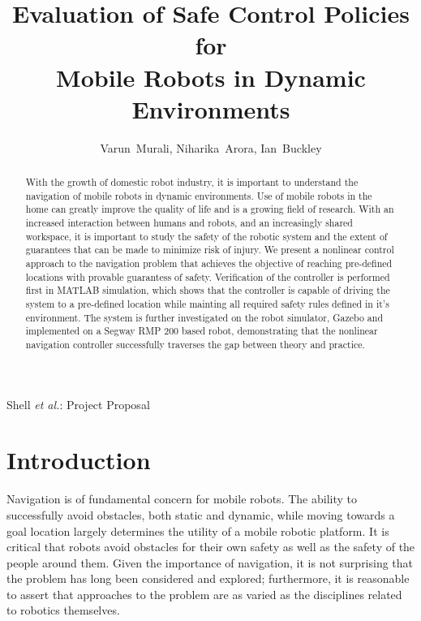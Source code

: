 \documentclass[journal]{IEEEtran}
\begin{document}
\title{Evaluation of Safe Control Policies for \\Mobile Robots in Dynamic Environments }
\author{Varun~Murali, Niharika~Arora, Ian~Buckley}
{Shell \MakeLowercase{\textit{et al.}}: Project Proposal}
\maketitle

\begin{abstract}
With the growth of domestic robot industry, it is important to understand the navigation of mobile robots in dynamic environments. Use of mobile robots in the home can greatly improve the quality of life and is a growing field of research. With an increased interaction between humans and robots, and an increasingly shared workspace, it is important to study the safety of the robotic system and the extent of guarantees that can be made to minimize risk of injury. We present a nonlinear control approach to the navigation problem that achieves the objective of reaching pre-defined locations with provable guarantess of safety. Verification of the controller is performed first in MATLAB simulation, which shows that the controller is capable of driving the system to a pre-defined location while mainting all required safety rules defined in it's environment. The system is further investigated on the robot simulator, Gazebo and implemented on a Segway RMP 200 based robot, demonstrating that the nonlinear navigation controller successfully traverses the gap between theory and practice. 
\end{abstract}

\section{Introduction}
Navigation is of fundamental concern for mobile robots. The ability to successfully avoid obstacles, both static and dynamic, while moving towards a goal location largely determines the utility of a mobile robotic platform. It is critical that robots avoid obstacles for their own safety as well as the safety of the people around them. Given the importance of navigation, it is not surprising that the problem has long been considered and explored; furthermore, it is reasonable to assert that approaches to the problem are as varied as the disciplines related to robotics themselves.  
\end{document}
